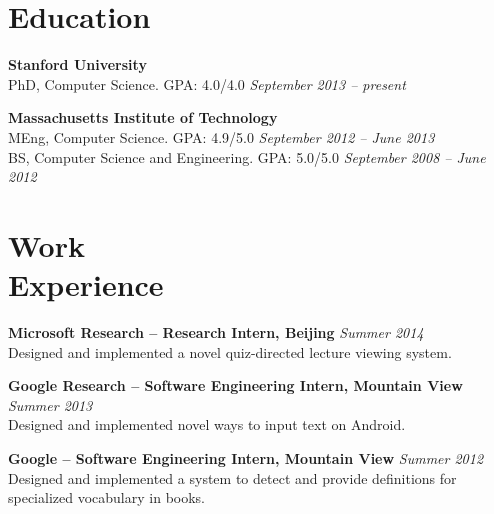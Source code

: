 \documentclass[margin,line]{resume}
\begin{document}
\vspace{-5.0mm}

\begin{resume}

\section{\mysidestyle Education}

\textbf{Stanford University} \vspace{0mm}\\\vspace{0mm}%
PhD, Computer Science. GPA: 4.0/4.0 \hfill \textsl{September 2013 -- present}

\textbf{Massachusetts Institute of Technology} \vspace{0mm}\\\vspace{0mm}%
MEng, Computer Science. GPA: 4.9/5.0 \hfill \textsl{September 2012 -- June 2013}\\\vspace{1mm}%
BS, Computer Science and Engineering. GPA: 5.0/5.0 \hfill \textsl{September 2008 -- June 2012}\vspace{-0.8mm}

\section{\mysidestyle Work\\Experience}

\textbf{Microsoft Research -- Research Intern, Beijing} \hfill \textsl{Summer 2014}\\
Designed and implemented a novel quiz-directed lecture viewing system.

\textbf{Google Research -- Software Engineering Intern, Mountain View} \hfill \textsl{Summer 2013}\\
Designed and implemented novel ways to input text on Android.

\textbf{Google -- Software Engineering Intern, Mountain View} \hfill \textsl{Summer 2012}\\
Designed and implemented a system to detect and provide definitions for specialized vocabulary in books. %


\end{resume}
\end{document}
